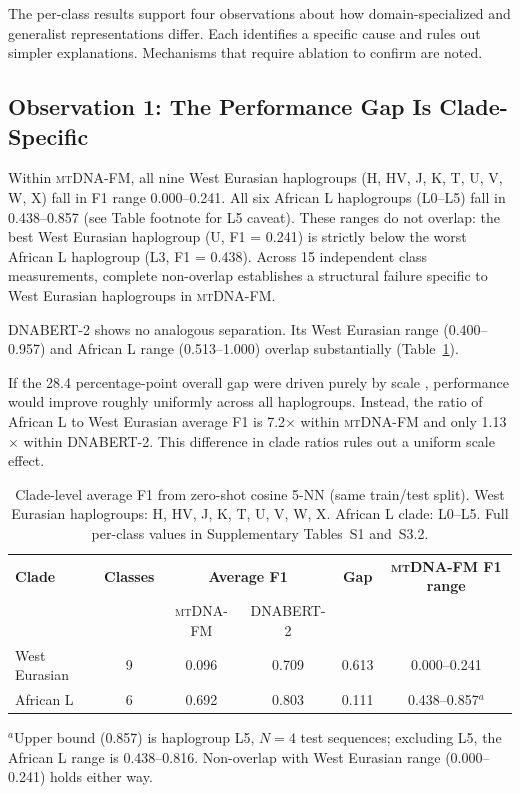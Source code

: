 \documentclass[10pt]{article}
\newcommand{\mtdnafm}{\textsc{mtDNA-FM}\xspace}
\begin{document}
The per-class results support four observations about how domain-specialized and generalist
representations differ. Each identifies a specific cause and rules out simpler explanations.
Mechanisms that require ablation to confirm are noted.

\subsection{Observation 1: The Performance Gap Is Clade-Specific}
\label{sec:clade_specific}

Within \mtdnafm{}, all nine West Eurasian haplogroups (H, HV, J, K, T, U, V, W, X) fall in F1
range 0.000--0.241. All six African L haplogroups (L0--L5) fall in 0.438--0.857 (see Table
footnote for L5 caveat). These ranges do not overlap: the best West Eurasian haplogroup
(U, F1 = 0.241) is strictly below the worst African L haplogroup (L3, F1 = 0.438). Across 15
independent class measurements, complete non-overlap establishes a structural failure specific
to West Eurasian haplogroups in \mtdnafm{}.

DNABERT-2 shows no analogous separation. Its West Eurasian range (0.400--0.957) and African L
range (0.513--1.000) overlap substantially (Table~\ref{tab:clade_summary}).

If the 28.4 percentage-point overall gap were driven purely by scale \citep{kaplan2020scaling},
performance would improve roughly uniformly across all haplogroups. Instead, the ratio of African
L to West Eurasian average F1 is 7.2$\times$ within \mtdnafm{} and only 1.13$\times$ within
DNABERT-2. This difference in clade ratios rules out a uniform scale effect.

\begin{table}[h]
\centering
\caption{Clade-level average F1 from zero-shot cosine 5-NN (same train/test split).
West Eurasian haplogroups: H, HV, J, K, T, U, V, W, X. African L clade: L0--L5.
Full per-class values in Supplementary Tables~S1 and~S3.2.}
\label{tab:clade_summary}
\begin{tabular}{lccccc}
\toprule
\textbf{Clade} & \textbf{Classes} &
\multicolumn{2}{c}{\textbf{Average F1}} & \textbf{Gap} &
\textbf{\mtdnafm{} F1 range} \\
& & \mtdnafm{} & DNABERT-2 & & \\
\midrule
West Eurasian & 9  & 0.096 & 0.709 & 0.613 & 0.000--0.241 \\
African L   & 6  & 0.692 & 0.803 & 0.111 & 0.438--0.857$^{a}$ \\
\bottomrule
\end{tabular}
\begin{minipage}{\linewidth}
\smallskip
\footnotesize $^{a}$Upper bound (0.857) is haplogroup L5, $N=4$ test sequences; excluding L5,
the African L range is 0.438--0.816. Non-overlap with West Eurasian range (0.000--0.241) holds
either way.
\end{minipage}
\end{table}
\end{document}
